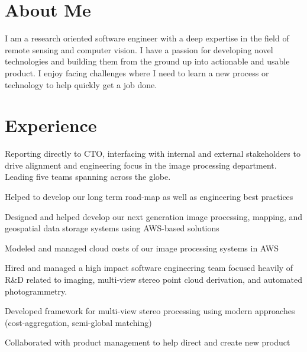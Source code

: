 \documentclass[]{deedy-resume-openfont}
\begin{document}
\begin{minipage}[t]{0.7\textwidth} 


\section{About Me}
I am a research oriented software engineer with a deep expertise in the field of remote sensing and computer vision. I have a passion for developing novel technologies and building them from the ground up into actionable and usable product. I enjoy facing challenges where I need to learn a new process or technology to help quickly get a job done.


\section{Experience}
\vspace{\topsep} %
\begin{tightemize}
	\item Reporting directly to CTO, interfacing with internal and external stakeholders to drive alignment and engineering focus in the image processing department. Leading five teams spanning across the globe.
	\item Helped to develop our long term road-map as well as engineering best practices
	\item Designed and helped develop our next generation image processing, mapping, and geospatial data storage systems using AWS-based solutions
	\item Modeled and managed cloud costs of our image processing systems in AWS
\end{tightemize}
\sectionsep

\begin{tightemize}
	\item Hired and managed a high impact software engineering team focused heavily of R\&D related to imaging, multi-view stereo point cloud derivation, and automated photogrammetry.
	\item Developed framework for multi-view stereo processing using modern approaches (cost-aggregation, semi-global matching)
	\item Collaborated with product management to help direct and create new product
\end{tightemize}
\sectionsep


\end{minipage}
\end{document}
